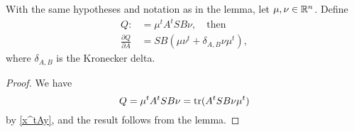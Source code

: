\documentclass[12pt,leqno]{article}
\begin{document}
      \begin{Cor}\label{dQdA}
        With the same hypotheses and notation as in the lemma, let $\mu,\nu\in {\mathbb R}^n$.  Define
  \begin{align*}
  Q :&= \mu^tA^tSB\nu,\quad\text{then}\\
  \frac{\partial{Q}}{\partial{A}} &= SB(\mu\nu^t+ \delta_{A,B}\nu\mu^t),
  \end{align*}
where $\delta_{A,B}$ is the Kronecker delta.
\end{Cor}
\begin{proof}
  
We have 
$$
  Q = \mu^tA^tSB\nu = \text{\rm tr}(A^tSB\nu\mu^t) 
  $$
by \eqref{x^tAy}, and the result follows from the lemma.


\end{proof}
\end{document}
